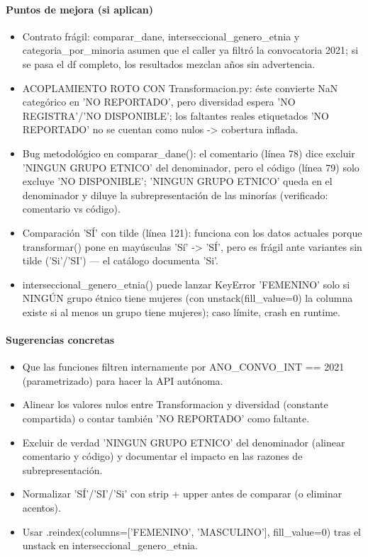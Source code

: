 \paragraph{Puntos de mejora (si aplican)}
\begin{itemize}
  \item Contrato frágil: comparar\_dane, interseccional\_genero\_etnia y categoria\_por\_minoria asumen que el caller ya filtró la convocatoria 2021; si se pasa el df completo, los resultados mezclan años sin advertencia.
  \item ACOPLAMIENTO ROTO CON Transformacion.py: éste convierte NaN categórico en 'NO REPORTADO', pero diversidad espera 'NO REGISTRA'/'NO DISPONIBLE'; los faltantes reales etiquetados 'NO REPORTADO' no se cuentan como nulos -> cobertura inflada.
  \item Bug metodológico en comparar\_dane(): el comentario (línea 78) dice excluir 'NINGUN GRUPO ETNICO' del denominador, pero el código (línea 79) solo excluye 'NO DISPONIBLE'; 'NINGUN GRUPO ETNICO' queda en el denominador y diluye la subrepresentación de las minorías (verificado: comentario vs código).
  \item Comparación 'SÍ' con tilde (línea 121): funciona con los datos actuales porque transformar() pone en mayúsculas 'Sí' -> 'SÍ', pero es frágil ante variantes sin tilde ('Si'/'SI') --- el catálogo documenta 'Si'.
  \item interseccional\_genero\_etnia() puede lanzar KeyError 'FEMENINO' solo si NINGÚN grupo étnico tiene mujeres (con unstack(fill\_value=0) la columna existe si al menos un grupo tiene mujeres); caso límite, crash en runtime.
\end{itemize}

\paragraph{Sugerencias concretas}
\begin{itemize}
  \item Que las funciones filtren internamente por ANO\_CONVO\_INT == 2021 (parametrizado) para hacer la API autónoma.
  \item Alinear los valores nulos entre Transformacion y diversidad (constante compartida) o contar también 'NO REPORTADO' como faltante.
  \item Excluir de verdad 'NINGUN GRUPO ETNICO' del denominador (alinear comentario y código) y documentar el impacto en las razones de subrepresentación.
  \item Normalizar 'SÍ'/'SI'/'Si' con strip + upper antes de comparar (o eliminar acentos).
  \item Usar .reindex(columns=['FEMENINO', 'MASCULINO'], fill\_value=0) tras el unstack en interseccional\_genero\_etnia.
\end{itemize}

